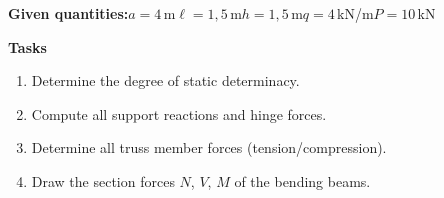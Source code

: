 \documentclass[a4paper,11pt]{article}
\begin{document}
\textbf{Given quantities:}\quad $a=4$\,m\quad $\ell=1,5$\,m\quad $h=1,5$\,m\quad $q=4$\,kN/m\quad $P=10$\,kN
\par\medskip
\textbf{Tasks}\par
\begin{enumerate}[label=\textbf{\arabic*.}]
  \item Determine the degree of static determinacy.
  \item Compute all support reactions and hinge forces.
  \item Determine all truss member forces (tension/compression).
  \item Draw the section forces $N$, $V$, $M$ of the bending beams.
\end{enumerate}
\end{document}
